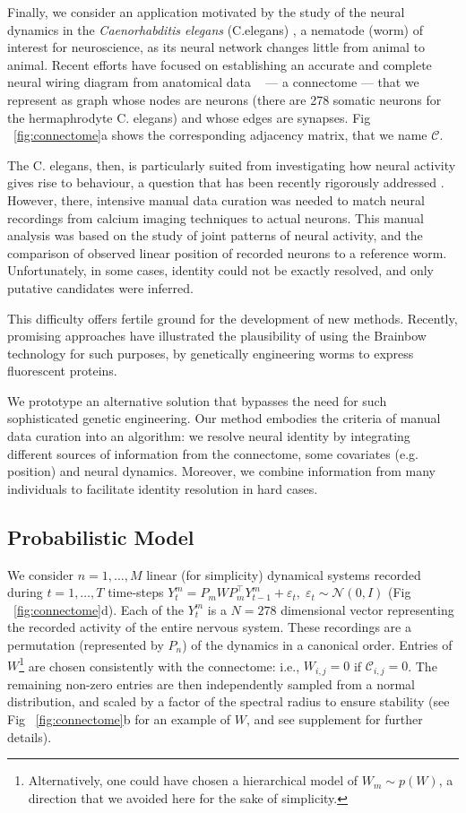 \documentclass[twoside]{article}
\begin{document}
Finally, we consider an application motivated by the study of the neural dynamics in the \textit{Caenorhabditis elegans} (C.elegans)  \cite{Kato2015}, a nematode (worm) of interest for neuroscience, as its neural network changes little from animal to animal. Recent efforts have focused on establishing an accurate and complete neural wiring diagram from anatomical data ~\citep{varshney2011structural} --- a connectome --- that we represent as graph whose nodes are neurons (there are 278 somatic neurons for the hermaphrodyte C. elegans) and whose edges are synapses. Fig ~\ref{fig:connectome}a shows the corresponding adjacency matrix, that we name $\mathcal{C}$.

The C. elegans, then, is particularly suited from investigating how neural activity gives rise to behaviour, a question that has been recently rigorously addressed \cite{Kato2015}. However, there, intensive manual data curation was needed to match neural recordings from calcium imaging techniques to actual neurons. This manual analysis was based on the study of joint patterns of neural activity, and the comparison of observed linear position of recorded neurons to a reference worm. Unfortunately, in some cases, identity could not be exactly resolved, and only putative candidates were inferred. 

This difficulty offers fertile ground for the development of new methods. Recently, promising approaches \cite{Aoki2017} have illustrated the plausibility of using the Brainbow technology \cite{Livet2007} for such purposes, by genetically engineering worms to express fluorescent proteins. 

We prototype an alternative solution that bypasses the need for such sophisticated genetic engineering. Our method embodies the criteria of manual data curation into an algorithm: we resolve neural identity by integrating different sources of information from the connectome, some covariates (e.g. position) and neural dynamics. Moreover, we combine information from many individuals to facilitate identity resolution in hard cases.

\subsection{Probabilistic Model}
We consider $n=1,\ldots, M$ linear (for simplicity) dynamical systems recorded during $t=1,\ldots, T$ time-steps $Y^m_t=P_mWP_m^\top Y^m_{t-1}+\varepsilon_t,\;\varepsilon_t\sim\mathcal{N}(0,I)$ (Fig ~\ref{fig:connectome}d). Each of the $Y_t^m$ is a $N=278$ dimensional vector representing the recorded activity of the entire nervous system. These recordings are a permutation (represented by $P_n$) of the dynamics in a canonical order.  Entries of $W$\footnote{Alternatively, one could have chosen a hierarchical model of $W_m\sim p(W)$, a direction that we avoided here for the sake of simplicity.} are chosen consistently with the connectome: i.e., $W_{i,j}=0$ if $\mathcal{C}_{i,j}=0$. The remaining non-zero entries are then independently sampled from a normal distribution, and scaled by a factor of the spectral radius to ensure stability (see Fig ~\ref{fig:connectome}b for an example of $W$, and see supplement for further details).
\end{document}
